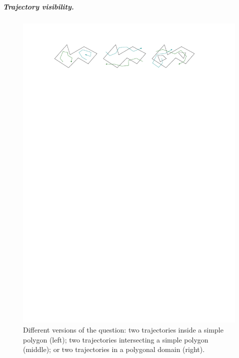 \documentclass[UKenglish]{lipics-v2019}
\begin{document}
\subparagraph {Trajectory visibility.}


\begin{figure} [tb]
	\centering \includegraphics {variants} 
	\caption
	{
	  Different versions of the question:
	  two trajectories inside a simple polygon (left);
	  two trajectories intersecting a simple polygon (middle);
	  or two trajectories in a polygonal domain (right).
	}  
	\addtolength{\belowcaptionskip}{-50pt}
	\label{fig:variants}
\end{figure}
\end{document}

